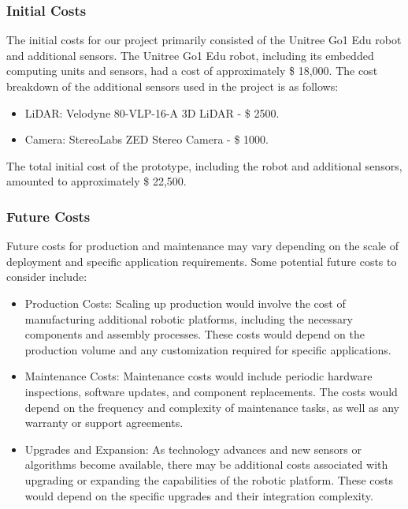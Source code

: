 \documentclass[12pt]{article}
\begin{document}
        \subsubsection{Initial Costs}

        The initial costs for our project primarily consisted of the Unitree Go1 Edu robot and additional sensors. The Unitree Go1 Edu robot, including its embedded computing units and sensors, had a cost of approximately \$ 18,000. The cost breakdown of the additional sensors used in the project is as follows:
            
        \begin{itemize}
            \item LiDAR: Velodyne 80-VLP-16-A 3D LiDAR - \$ 2500.
            \item Camera: StereoLabs ZED Stereo Camera - \$ 1000.
        \end{itemize}
        
        The total initial cost of the prototype, including the robot and additional sensors, amounted to approximately \$ 22,500.

        \subsubsection{Future Costs}

        Future costs for production and maintenance may vary depending on the scale of deployment and specific application requirements. Some potential future costs to consider include:

        \begin{itemize}
            \item Production Costs: Scaling up production would involve the cost of manufacturing additional robotic platforms, including the necessary components and assembly processes. These costs would depend on the production volume and any customization required for specific applications.
            \item Maintenance Costs: Maintenance costs would include periodic hardware inspections, software updates, and component replacements. The costs would depend on the frequency and complexity of maintenance tasks, as well as any warranty or support agreements.
            \item Upgrades and Expansion: As technology advances and new sensors or algorithms become available, there may be additional costs associated with upgrading or expanding the capabilities of the robotic platform. These costs would depend on the specific upgrades and their integration complexity.
        \end{itemize}
\end{document}
